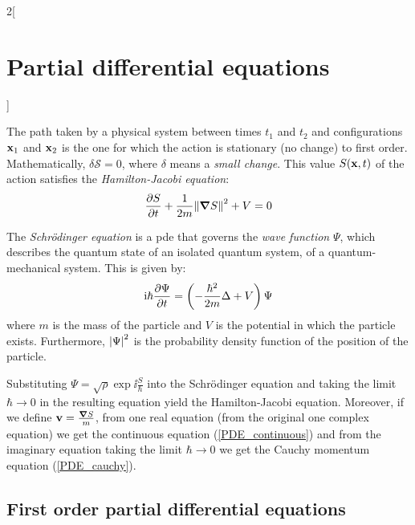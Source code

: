 \documentclass[../../../main_math.tex]{subfiles}
\begin{document}
\begin{multicols}{2}[\section{Partial differential equations}]
  \begin{proposition}
    The path taken by a physical system between times $t_1$ and $t_2$ and configurations $\boldsymbol{\mathrm{x}}_1$ and $\boldsymbol{\mathrm{x}}_2$ is the one for which the action is stationary (no change) to first order. Mathematically, $\delta \mathcal{S}=0$, where $\delta$ means a \emph{small change}. This value $S(\boldsymbol{\mathrm{x}},t)$ of the action satisfies the \emph{Hamilton-Jacobi equation}: $$\pdv{S}{t}+\frac{1}{2m}{\left\|\grad S\right\|}^2+V=0$$
  \end{proposition}
  \begin{proposition}
    The \emph{Schrödinger equation} is a pde that governs the \emph{wave function} $\Psi$, which describes the quantum state of an isolated quantum system, of a quantum-mechanical system. This is given by: $$\mathrm{i} \hbar\pdv{\Psi}{t}=\left(-\frac{\hbar^2}{2m}\Delta+V\right){\Psi}$$ where $m$ is the mass of the particle and $V$ is the potential in which the particle exists. Furthermore, $\abs{\Psi}^2$ is the probability density function of the position of the particle.
  \end{proposition}
  \begin{proposition}
    Substituting ${\Psi}=\sqrt{\rho}\exp{\ii \frac{S}{\hbar}}$ into the Schrödinger equation and taking the limit $\hbar\to 0$ in the resulting equation yield the Hamilton-Jacobi equation. Moreover, if we define $\boldsymbol{\mathrm{v}}=\frac{\grad{S}}{m}$, from one real equation (from the original one complex equation) we get the continuous equation (\cref{PDE_continuous}) and from the imaginary equation taking the limit $\hbar\to 0$ we get the Cauchy momentum equation (\cref{PDE_cauchy}).
  \end{proposition}
  \subsection{First order partial differential equations}

\end{multicols}
\end{document}
